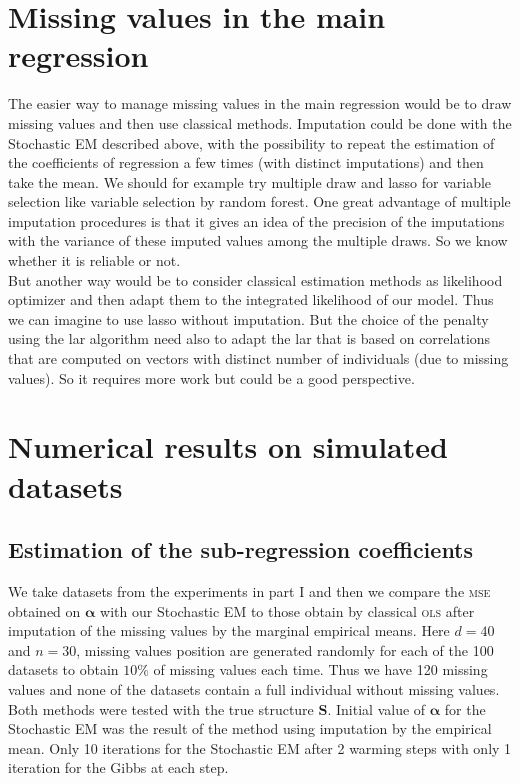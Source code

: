 \documentclass[12pt,a4paper]{report}
\begin{document}
	\section{Missing values in the main regression}
		The easier way to manage missing values in the main regression would be to draw missing values and then use classical methods. Imputation could be done with the Stochastic EM described above, with the possibility to repeat the estimation of the coefficients of regression a few times (with distinct imputations) and then take the mean. We should for example try multiple draw and {\sc lasso} for variable selection like variable selection by random forest. One great advantage of multiple imputation procedures is that it gives an idea of the precision of the imputations with the variance of these imputed values among the multiple draws. So we know whether it is reliable or not. \\
		
		
				

		
		But another way would be to consider classical estimation methods as likelihood optimizer and then adapt them to the integrated likelihood of our model. Thus we can imagine to use {\sc lasso} without imputation. But the choice of the penalty using the {\sc lar} algorithm need also to adapt the {\sc lar} that is based on correlations that are computed on vectors with distinct number of individuals (due to missing values). So it requires more work but could be a good perspective.
	\section{Numerical results on simulated datasets}
		\subsection{Estimation of the sub-regression coefficients}
			We take datasets from the experiments in part I and then we compare the \textsc{mse} obtained on $\boldsymbol{\alpha}$ with our Stochastic EM to those obtain by classical \textsc{ols} after imputation of the missing values by the marginal empirical means. Here $d=40$ and $n=30$, missing values position are generated randomly for each of the 100 datasets to obtain $10 \%$ of missing values each time. Thus we have 120 missing values and none of the datasets contain a full individual without missing values.
Both methods were tested with the true structure $\boldsymbol{S}$. Initial value of $\boldsymbol{\alpha}$ for the Stochastic EM was the result of the method using imputation by the empirical mean. Only 10 iterations for the Stochastic EM after 2 warming steps with only 1 iteration for the Gibbs at each step.
\end{document}
